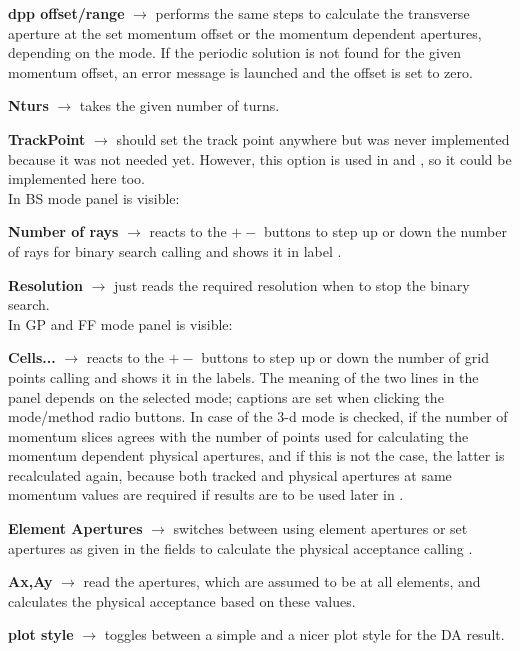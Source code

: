 \documentclass[12pt]{article}
\newcommand\code[1]{{\tt #1}}
\newcommand{\ofld}[1]{\colorbox{black!15}{{{\color{black}\bf #1}}}}
\newcommand\guico[1]{{\color{blue}\code{#1}}}
\newcommand{\evcod}[2]{\ofld{#1} $\rightarrow$ \guico{#2}}
\newcommand{\opagui}[1]{\colorbox{blue!20}{{\color{black}\code{#1}}}}
\newcommand{\ogui}[1]{\hyperref[#1]{\opagui{#1}}}
\newcommand{\todo}[1]{{\color{red} #1}}
\begin{document}
\evcod{dpp offset/range}{eddppaction} performs the same steps to calculate the transverse aperture at the set momentum offset or the momentum dependent apertures, depending on the mode. If the periodic solution is not found for the given momentum offset, an error message is launched and the offset is set to zero.

\evcod{Nturs}{edturns(KeyPress,Exit)} takes the given number of turns.

\todo{\evcod{TrackPoint}{esposaction} should set the track point anywhere but was never implemented because it was not needed yet. However, this option is used in \ogui{opatrackps} and \ogui{opatracktt}, so it could be implemented here too.}\\[1ex]

In BS mode panel \guico{PanNRay} is visible: 

\evcod{Number of rays}{butnrclick} reacts to the \ofld{$+-$} buttons to step up or down the number of rays for binary search calling \guico{UpdateGridParams} and shows it in label \guico{labnr}.

\evcod{Resolution}{edreso(KEyPress,Exit)} just reads the required resolution when to stop the binary search. \\[1ex]

In GP and FF mode panel \guico{PanGrid} is visible:

\evcod{Cells...}{bugNgClick} reacts to the \ofld{$+-$} buttons to step up or down the number of grid points calling \guico{UpdateGridParams} and shows it in the labels. The meaning of the two lines in the panel depends on the selected mode; captions are set when clicking the mode/method radio buttons. In case of the 3-d mode is checked, if the number of momentum slices agrees with the number of points used for calculating the momentum dependent physical apertures, and if this is not the case, the latter is recalculated again, because both tracked and physical apertures at same momentum values are required if results are to be used later in \ogui{opatracktt}.

\evcod{Element Apertures}{cbxAperClick} switches between using element apertures or set apertures as given in the \guico{eda(x,y)} fields to calculate the physical acceptance calling \guico{UpdateApertures}.

\evcod{Ax,Ay}{eda(x,y)(KeyPress,Exit)} read the apertures, which are assumed to be at all elements, and calculates the physical acceptance based on these values.

\evcod{plot style}{butplotStyleClick} toggles between a simple and a nicer plot style for the DA result.
\end{document}
